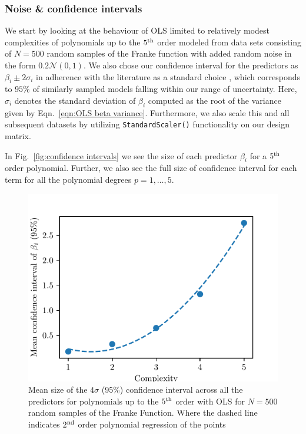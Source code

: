 \documentclass[reprint, english, nofootinbib]{revtex4-2}
\begin{document}
\subsubsection{Noise \& confidence intervals}

\noindent
We start by looking at the behaviour of OLS limited to relatively modest complexities of polynomials up to the $5^{\textup{th}}$ order modeled from data sets consisting of $N=500$ random samples of the Franke function with added random noise in the form $0.2\mathcal N(0, 1)$. We also chose our confidence interval for the predictors as $\beta_i\pm 2\sigma_i$ in adherence with the literature as a standard choice \cite{hastie}, which corresponds to $95\%$ of similarly sampled models falling within our range of uncertainty. Here, $\sigma_i$ denotes the standard deviation of $\beta_i$ computed as the root of the variance given by Eqn.~\ref{eqn:OLS beta variance}.
Furthermore, we also scale this and all subsequent datasets by utilizing \lstinline{StandardScaler()} functionality on our design matrix.

In Fig.~\ref{fig:confidence intervals} we see the size of each predictor $\beta_i$ for a $5^{\textup{th}}$ order polynomial. Further, we also see the full size of confidence interval for each term for all the polynomial degrees $p = 1,\dots, 5$.

\begin{figure}[h!tb]
    \centering
    \includegraphics[width=.8\columnwidth]{Franke_mean_confidence_interval.pdf}
    \caption{Mean size of the $4\sigma$ (95\%) confidence interval across all the predictors for polynomials up to the $5^{\textup{th}}$ order with OLS for $N=500$ random samples of the Franke Function. Where the dashed line indicates $2^\textup{nd}$ order polynomial regression of the points}
    \label{fig:mean confidence interval}
\end{figure}
\end{document}
